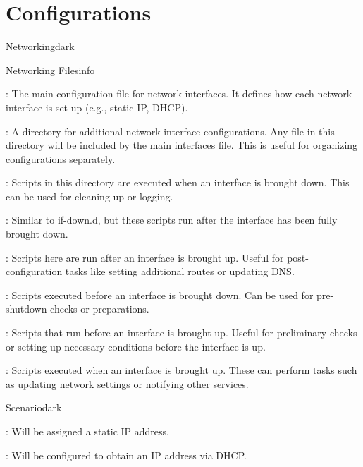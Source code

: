 \section{Configurations}
\label{Configurations}



\label{Networking}
\begin{baseBoxThree}{Networking}{dark}
    \begin{baseBoxThree}{Networking Files}{info}    
        \begin{posnexItemize}
            \item[\sA] : The main configuration file for network interfaces. It defines how each network interface is set up (e.g., static IP, DHCP).
            \item[\sA] : A directory for additional network interface configurations. Any file in this directory will be included by the main interfaces file. This is useful for organizing configurations separately. 
            \item[\sA] : Scripts in this directory are executed when an interface is brought down. This can be used for cleaning up or logging. 
            \item[\sA] : Similar to if-down.d, but these scripts run after the interface has been fully brought down. 
            \item[\sA] : Scripts here are run after an interface is brought up. Useful for post-configuration tasks like setting additional routes or updating DNS.
            \item[\sA] : Scripts executed before an interface is brought down. Can be used for pre-shutdown checks or preparations.
            \item[\sA] : Scripts that run before an interface is brought up. Useful for preliminary checks or setting up necessary conditions before the interface is up.
            \item[\sA] : Scripts executed when an interface is brought up. These can perform tasks such as updating network settings or notifying other services.
        \end{posnexItemize}
    \end{baseBoxThree}
    \smallskip
    \begin{baseBoxThree}{Scenario}{dark}
        \begin{posnexItemize}
            \item[\sA] : Will be assigned a static IP address.
            \item[\sA] : Will be configured to obtain an IP address via DHCP.
        \end{posnexItemize}        
    \end{baseBoxThree}
\end{baseBoxThree}

